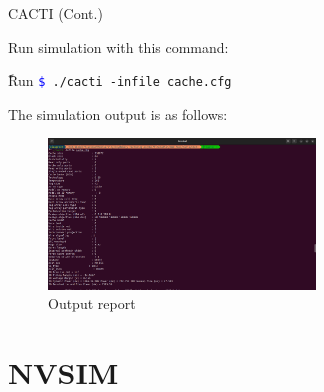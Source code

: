 \documentclass{beamer}
\begin{document}
\begin{frame}{CACTI (Cont.)}
	
	Run simulation with this command:
	
	\begin{block}{ًRun}
		\texttt{\textcolor{blue}{\$} ./cacti -infile cache.cfg}\\
	\end{block}
	
	The simulation output is as follows:
	
	\begin{figure}
		\centering
		\includegraphics[height=4cm]{images/img5}
		\caption{Output report}
		\label{fig:Output report}
	\end{figure}
	
\end{frame}







%
%

\section{NVSIM}
\end{document}
